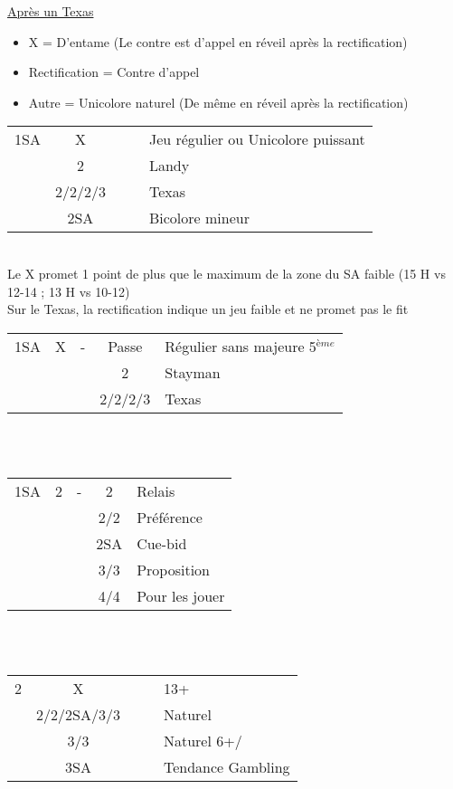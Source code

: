 \documentclass[a4paper, oneside, 11pt]{report}
\begin{document}
	\underline{Après un Texas}
	
	\begin{itemize}
	\item X = D'entame (Le contre est d'appel en réveil après la rectification)
	\item Rectification = Contre d'appel
	\item Autre = Unicolore naturel (De même en réveil après la rectification)\\
	\end{itemize}

	\begin{tabular}{cccc|l}
	1SA & X &&& Jeu régulier ou Unicolore puissant\\
	& 2\trefle &&& Landy\\
	& 2\carreau/2\coeur/2\pique/3\trefle &&& Texas\\
	& 2SA &&& Bicolore mineur\\
	\end{tabular}\\
	Le X promet 1 point de plus que le maximum de la zone du SA faible (15 H vs 12-14 ; 13 H vs 10-12)\\
	Sur le Texas, la rectification indique un jeu faible et ne promet pas le fit\\

	\begin{tabular}{cccc|l}
	1SA & X & - & Passe & Régulier sans majeure 5$^{ème}$\\
	&&& 2\trefle & Stayman\\
	&&& 2\carreau/2\coeur/2\pique/3\trefle & Texas\\
	\end{tabular}\\\\

	\begin{tabular}{cccc|l}
	1SA & 2\trefle & - & 2\carreau & Relais\\
	&&& 2\coeur/2\pique & Préférence\\
	&&& 2SA & Cue-bid\\
	&&& 3\coeur/3\pique & Proposition\\
	&&& 4\coeur/4\pique & Pour les jouer\\
	\end{tabular}\\\\

	\begin{tabular}{cccc|l}
	2\carreau & X &&& 13+\\
	& 2\coeur/2\pique/2SA/3\trefle/3\carreau &&& Naturel\\
	& 3\coeur/3\pique &&& Naturel 6+\coeur/\pique\\
	& 3SA &&& Tendance Gambling\\
	\end{tabular}\\\\
	
\end{document}
